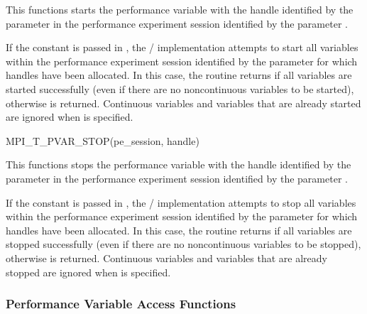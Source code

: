 This functions starts the performance variable with the handle identified
by the parameter  in the performance experiment session identified by the parameter
.

If the constant  is passed in
, the \MPI/ implementation attempts to start all variables
within the performance experiment session identified by the parameter  for
which handles have been allocated.  In this case, the routine returns
 if all variables are started successfully (even if
there are no noncontinuous variables to be started), otherwise
 is returned.  Continuous variables
and variables that are already started are ignored when
 is specified.

\begin{funcdef}{MPI\_T\_PVAR\_STOP}{(\mbox{pe\_session}, \mbox{handle})}
\end{funcdef}

This functions stops the performance variable with the handle identified by
the parameter  in the performance experiment session identified by the parameter
.

If the constant  is passed in
, the \MPI/ implementation attempts to stop all variables
within the performance experiment session identified by the parameter  for
which handles have been allocated.  In this case, the routine returns
 if all variables are stopped successfully (even if
there are no noncontinuous variables to be stopped), otherwise
 is returned.  Continuous variables
and variables that are already stopped are ignored when
 is specified.


\subsubsection{Performance Variable Access Functions}

